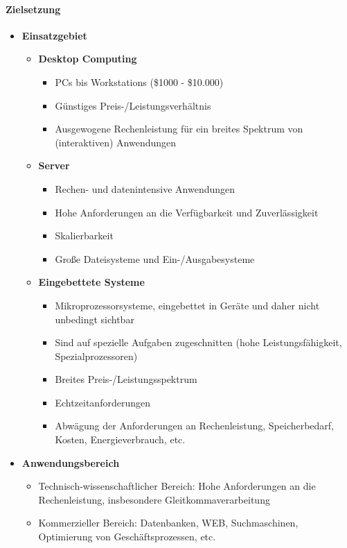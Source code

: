 	\paragraph{Zielsetzung}
		\begin{itemize}
			\item \textbf{Einsatzgebiet}
			\begin{itemize}
				\item \textbf{Desktop Computing}
				\begin{itemize}
					\item PCs bis Workstations (\$1000 - \$10.000)
					\item Günstiges Preis-/Leistungsverhältnis
					\item Ausgewogene Rechenleistung für ein breites Spektrum von (interaktiven) Anwendungen
				\end{itemize}
				\item \textbf{Server}
				\begin{itemize}
					\item Rechen- und datenintensive Anwendungen
					\item Hohe Anforderungen an die Verfügbarkeit und Zuverlässigkeit
					\item Skalierbarkeit
					\item Große Dateisysteme und Ein-/Ausgabesysteme
				\end{itemize}
				\item \textbf{Eingebettete Systeme}
				\begin{itemize}
					\item Mikroprozessorsysteme, eingebettet in Geräte und daher nicht unbedingt sichtbar
					\item Sind auf spezielle Aufgaben zugeschnitten (hohe Leistungsfähigkeit, Spezialprozessoren)
					\item Breites Preis-/Leistungsspektrum
					\item Echtzeitanforderungen
					\item Abwägung der Anforderungen an Rechenleistung, Speicherbedarf, Kosten, Energieverbrauch, etc.
				\end{itemize}
			\end{itemize}
			\item \textbf{Anwendungsbereich}
			\begin{itemize}
				\item Technisch-wissenschaftlicher Bereich: Hohe Anforderungen an die Rechenleistung, insbesondere Gleitkommaverarbeitung
				\item Kommerzieller Bereich: Datenbanken, WEB, Suchmaschinen, Optimierung von Geschäftsprozessen, etc.

\end{itemize}
\end{itemize}

